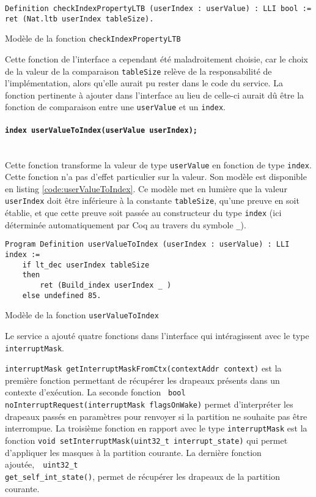 		\begin{listing}[!ht]
			\begin{verbatim}
Definition checkIndexPropertyLTB (userIndex : userValue) : LLI bool :=
ret (Nat.ltb userIndex tableSize).
			\end{verbatim}
			\caption{Modèle de la fonction \texttt{checkIndexPropertyLTB}}
		\end{listing}
		Cette fonction de l'interface a cependant été maladroitement choisie, car le choix de la valeur de la comparaison \texttt{tableSize} relève de la responsabilité de l'implémentation, alors qu'elle aurait pu rester dans le code du service. La fonction pertinente à ajouter dans l'interface au lieu de celle-ci aurait dû être la fonction de comparaison entre une \texttt{userValue} et un \texttt{index}.

		\paragraph{\texttt{index userValueToIndex(userValue userIndex);}}~\\
		Cette fonction transforme la valeur de type \texttt{userValue} en fonction de type \texttt{index}. Cette fonction n'a pas d'effet particulier sur la valeur.
		Son modèle est disponible en listing \ref{code:userValueToIndex}. Ce modèle met en lumière que la valeur \texttt{userIndex} doit être inférieure à la constante \texttt{tableSize}, qu'une preuve en soit établie, et que cette preuve soit passée au constructeur du type \texttt{index} (ici déterminée automatiquement par Coq au travers du symbole \texttt{\_}).
		\begin{listing}[!ht]
			\begin{verbatim}
Program Definition userValueToIndex (userIndex : userValue) : LLI index :=
    if lt_dec userIndex tableSize
    then
        ret (Build_index userIndex _ )
    else undefined 85.
			\end{verbatim}
			\caption{Modèle de la fonction \texttt{userValueToIndex}}
			\label{code:userValueToIndex}
		\end{listing}

		\newpage
		Le service a ajouté quatre fonctions dans l'interface qui intéragissent avec le type \texttt{interruptMask}.

		\texttt{interruptMask getInterruptMaskFromCtx(contextAddr context)} est la première fonction permettant de récupérer les drapeaux présents dans un contexte d'exécution. La seconde fonction~ \texttt{bool noInterruptRequest(interruptMask flagsOnWake)} permet d'interpréter les drapeaux passés en paramètres pour renvoyer si la partition ne souhaite pas être interrompue. La troisième fonction en rapport avec le type \texttt{interruptMask} est la fonction \texttt{void setInterruptMask(uint32_t interrupt_state)} qui permet d'appliquer les masques à la partition courante. La dernière fonction ajoutée,~~\texttt{uint32_t}\\ \texttt{get_self_int_state()}, permet de récupérer les drapeaux de la partition courante.

